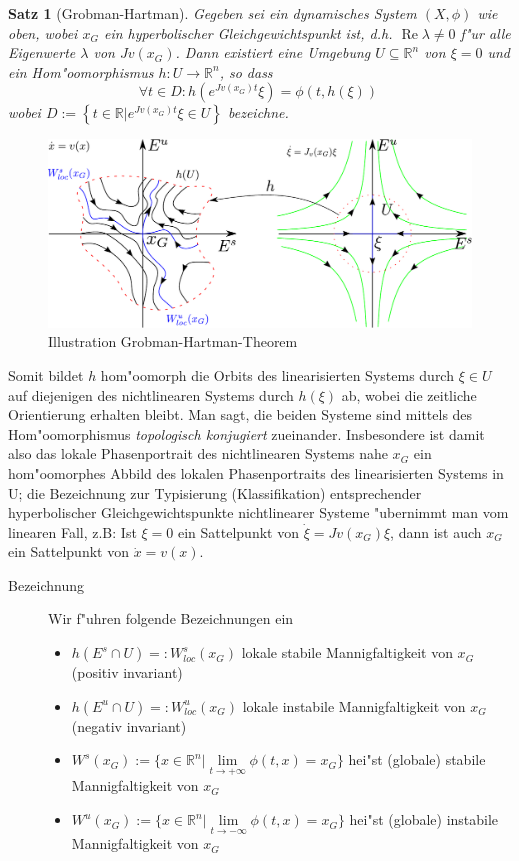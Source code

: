 \documentclass[a4paper, 13pt]{scrreprt}
\newtheorem{satz}{Satz}[section]
\theoremstyle{definition} \newtheorem{definition}{Definition}[section]
\newcommand{\RR}{\mathbb{R}}
\begin{document}
\begin{satz}[Grobman-Hartman]\label{Grobman-Hartman}
Gegeben sei ein dynamisches System $(X,\phi)$ wie oben, wobei $x_G$ ein hyperbolischer Gleichgewichtspunkt ist, d.h. $\operatorname{Re}\lambda \neq 0$ f"ur alle Eigenwerte $\lambda$ von $Jv(x_G)$. Dann existiert eine Umgebung $U\subseteq \RR^n$ von $\xi =0$ und ein Hom"oomorphismus $h:U\to\mathbb{R}^n$, so dass \[ \forall t\in D: h(e^{Jv(x_G)t}\xi)=\phi(t,h(\xi))\ \] wobei $D := \left \{ \left . t \in \RR \right| e^{Jv(x_G)t}\xi \in U \right \}$ bezeichne.
\end{satz}
\begin{figure}[htpb]
		\centering
		\includegraphics[width=1\textwidth]{img/grobman-hartman.pdf}
		\caption{Illustration Grobman-Hartman-Theorem}
\end{figure}

Somit bildet $h$ hom"oomorph die Orbits des linearisierten Systems durch $\xi\in U$ auf diejenigen des nichtlinearen Systems durch $h(\xi)$ ab, wobei die zeitliche Orientierung erhalten bleibt. Man sagt, die beiden Systeme sind mittels des Hom"oomorphismus \emph{topologisch konjugiert} zueinander. Insbesondere ist damit also das lokale Phasenportrait des nichtlinearen Systems nahe $x_G$ ein hom"oomorphes Abbild des lokalen Phasenportraits des linearisierten Systems in U; die Bezeichnung zur Typisierung (Klassifikation) entsprechender hyperbolischer Gleichgewichtspunkte nichtlinearer Systeme "ubernimmt man vom linearen Fall, z.B: Ist $\xi =0$ ein Sattelpunkt von $\dot{\xi}=Jv(x_G)\xi$, dann ist auch $x_G$ ein Sattelpunkt von $\dot{x}=v(x)$.

\begin{description}
\item[Bezeichnung]Wir f"uhren folgende Bezeichnungen ein
\begin{itemize}
\item $h(E^s\cap U)=: W_{loc}^s(x_G)$ lokale stabile Mannigfaltigkeit von $x_G$ (positiv invariant)\\
\item $h(E^u\cap U)=: W_{loc}^u(x_G)$ lokale instabile Mannigfaltigkeit von $x_G$ (negativ invariant)\\
\item $W^s(x_G):=\{x\in\mathbb{R}^n|\lim\limits_{t\to +\infty}\phi (t,x)=x_G\}$ hei"st (globale) stabile Mannigfaltigkeit von $x_G$\\
\item $W^u(x_G):=\{x\in\mathbb{R}^n|\lim\limits_{t\to -\infty}\phi (t,x)=x_G\}$ hei"st (globale) instabile Mannigfaltigkeit von $x_G$
\end{itemize}
\end{description}
\end{document}
